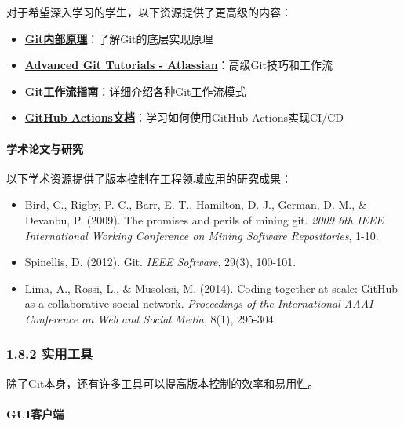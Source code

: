 对于希望深入学习的学生，以下资源提供了更高级的内容：

\begin{itemize}
\tightlist
\item
  \textbf{\href{https://git-scm.com/book/zh/v2/Git-\%E5\%86\%85\%E9\%83\%A8\%E5\%8E\%9F\%E7\%90\%86-\%E5\%BA\%95\%E5\%B1\%82\%E5\%91\%BD\%E4\%BB\%A4\%E4\%B8\%8E\%E5\%AF\%B9\%E8\%B1\%A1}{Git内部原理}}：了解Git的底层实现原理
\item
  \textbf{\href{https://www.atlassian.com/git/tutorials/advanced-overview}{Advanced
  Git Tutorials - Atlassian}}：高级Git技巧和工作流
\item
  \textbf{\href{https://github.com/xirong/my-git/blob/master/git-workflow-tutorial.md}{Git工作流指南}}：详细介绍各种Git工作流模式
\item
  \textbf{\href{https://docs.github.com/cn/actions}{GitHub
  Actions文档}}：学习如何使用GitHub Actions实现CI/CD
\end{itemize}

\paragraph{学术论文与研究}\label{ux5b66ux672fux8bbaux6587ux4e0eux7814ux7a76}

以下学术资源提供了版本控制在工程领域应用的研究成果：

\begin{itemize}
\tightlist
\item
  Bird, C., Rigby, P. C., Barr, E. T., Hamilton, D. J., German, D. M.,
  \& Devanbu, P. (2009). The promises and perils of mining git.
  \emph{2009 6th IEEE International Working Conference on Mining
  Software Repositories}, 1-10.
\item
  Spinellis, D. (2012). Git. \emph{IEEE Software}, 29(3), 100-101.
\item
  Lima, A., Rossi, L., \& Musolesi, M. (2014). Coding together at scale:
  GitHub as a collaborative social network. \emph{Proceedings of the
  International AAAI Conference on Web and Social Media}, 8(1), 295-304.
\end{itemize}

\subsubsection{1.8.2 实用工具}\label{ux5b9eux7528ux5de5ux5177}

除了Git本身，还有许多工具可以提高版本控制的效率和易用性。

\paragraph{GUI客户端}\label{guiux5ba2ux6237ux7aef}

